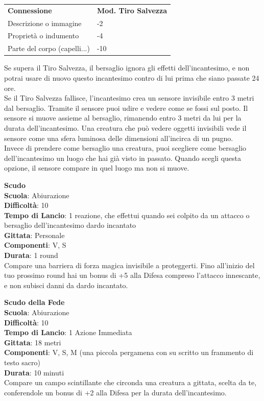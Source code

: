 \begin{multicols}{2}
\medskip

\begin{tabular}{ll}
	\toprule
\textbf{Connessione} & \textbf{Mod. Tiro Salvezza}\\
Descrizione o immagine &-2\\
Proprietà o indumento & -4\\
Parte del corpo (capelli...)&-10\\
\end{tabular}
\medskip

Se supera il Tiro Salvezza, il bersaglio ignora gli effetti dell'incantesimo, e non potrai usare di nuovo questo incantesimo contro di lui prima che siano passate 24 ore.\\
Se il Tiro Salvezza fallisce, l'incantesimo crea un sensore invisibile entro 3 metri dal bersaglio. Tramite il sensore puoi udire e vedere come se fossi sul posto. Il sensore si muove assieme al bersaglio, rimanendo entro 3 metri da lui per la durata dell'incantesimo. Una creatura che può vedere oggetti invisibili vede il sensore come una sfera luminosa delle dimensioni all'incirca di un pugno.\\
Invece di prendere come bersaglio una creatura, puoi scegliere come bersaglio dell'incantesimo un luogo che hai già visto in passato. Quando scegli questa opzione, il sensore compare in quel luogo ma non si muove. 

\medskip\textbf{Scudo}\\
\textbf{Scuola}: Abiurazione\\
\textbf{Difficoltà}: 10\\
\textbf{Tempo di Lancio}: 1 reazione, che effettui quando sei colpito da un attacco o bersaglio dell'incantesimo dardo incantato\\
\textbf{Gittata}: Personale\\
\textbf{Componenti}: V, S\\
\textbf{Durata}: 1 round\\
Compare una barriera di forza magica invisibile a proteggerti. Fino all'inizio del tuo prossimo round hai un bonus di +5 alla Difesa compreso l'attacco innescante, e non subisci danni da dardo incantato.

\medskip\textbf{Scudo della Fede}\\
\textbf{Scuola}: Abiurazione\\
\textbf{Difficoltà}: 10\\
\textbf{Tempo di Lancio}: 1 Azione Immediata\\
\textbf{Gittata}: 18 metri\\
\textbf{Componenti}: V, S, M (una piccola pergamena con su scritto un frammento di testo sacro)\\
\textbf{Durata}: 10 minuti\\
Compare un campo scintillante che circonda una creatura a gittata, scelta da te, conferendole un bonus di +2 alla Difesa per la durata dell'incantesimo.


\end{multicols}
